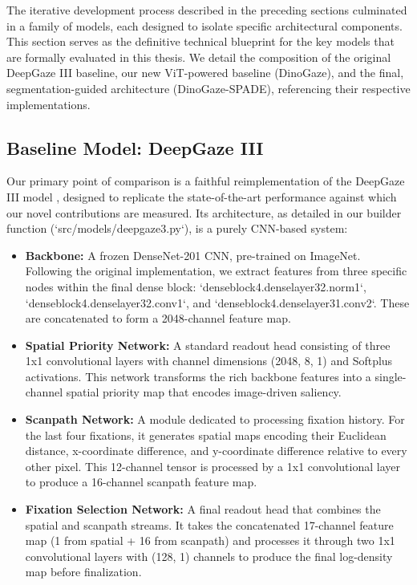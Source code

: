 The iterative development process described in the preceding sections culminated in a family of models, each designed to isolate specific architectural components. This section serves as the definitive technical blueprint for the key models that are formally evaluated in this thesis. We detail the composition of the original DeepGaze III baseline, our new ViT-powered baseline (DinoGaze), and the final, segmentation-guided architecture (DinoGaze-SPADE), referencing their respective implementations.

\subsection{Baseline Model: DeepGaze III}
Our primary point of comparison is a faithful reimplementation of the DeepGaze III model \cite{kummerer2022deepgaze}, designed to replicate the state-of-the-art performance against which our novel contributions are measured. Its architecture, as detailed in our builder function (`src/models/deepgaze3.py`), is a purely CNN-based system:

\begin{itemize}
    \item \textbf{Backbone:} A frozen DenseNet-201 CNN, pre-trained on ImageNet. Following the original implementation, we extract features from three specific nodes within the final dense block: `denseblock4.denselayer32.norm1`, `denseblock4.denselayer32.conv1`, and `denseblock4.denselayer31.conv2`. These are concatenated to form a 2048-channel feature map.
    \item \textbf{Spatial Priority Network:} A standard readout head consisting of three 1x1 convolutional layers with channel dimensions (2048, 8, 1) and Softplus activations. This network transforms the rich backbone features into a single-channel spatial priority map that encodes image-driven saliency.
    \item \textbf{Scanpath Network:} A module dedicated to processing fixation history. For the last four fixations, it generates spatial maps encoding their Euclidean distance, x-coordinate difference, and y-coordinate difference relative to every other pixel. This 12-channel tensor is processed by a 1x1 convolutional layer to produce a 16-channel scanpath feature map.
    \item \textbf{Fixation Selection Network:} A final readout head that combines the spatial and scanpath streams. It takes the concatenated 17-channel feature map (1 from spatial + 16 from scanpath) and processes it through two 1x1 convolutional layers with (128, 1) channels to produce the final log-density map before finalization.
\end{itemize}

